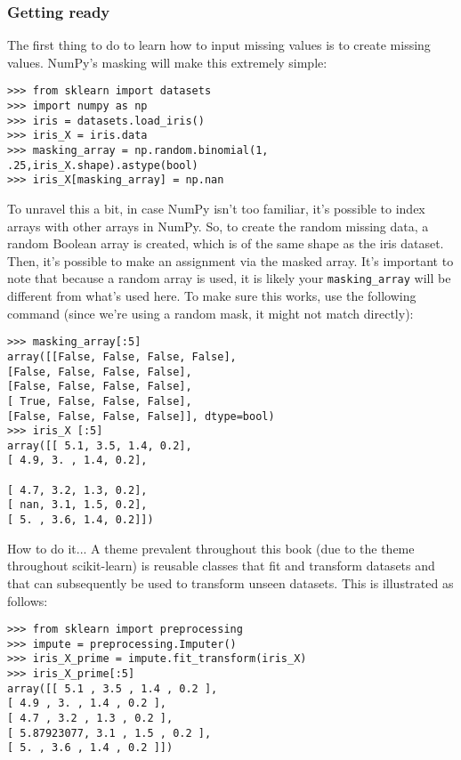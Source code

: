 \documentclass[SKL-MASTER.tex]{subfiles}
\begin{document}
\subsubsection{Getting ready}
The first thing to do to learn how to input missing values is to create missing values. NumPy's
masking will make this extremely simple:
\begin{framed}
\begin{verbatim}
>>> from sklearn import datasets
>>> import numpy as np
>>> iris = datasets.load_iris()
>>> iris_X = iris.data
>>> masking_array = np.random.binomial(1, .25,iris_X.shape).astype(bool)
>>> iris_X[masking_array] = np.nan
\end{verbatim}
\end{framed}
To unravel this a bit, in case NumPy isn't too familiar, it's possible to index arrays with other
arrays in NumPy. So, to create the random missing data, a random Boolean array is created,
which is of the same shape as the iris dataset. Then, it's possible to make an assignment
via the masked array. It's important to note that because a random array is used, it is likely
your \texttt{masking\_array} will be different from what's used here.
To make sure this works, use the following command (since we're using a random mask,
it might not match directly):
\begin{framed}
\begin{verbatim}
>>> masking_array[:5]
array([[False, False, False, False],
[False, False, False, False],
[False, False, False, False],
[ True, False, False, False],
[False, False, False, False]], dtype=bool)
>>> iris_X [:5]
array([[ 5.1, 3.5, 1.4, 0.2],
[ 4.9, 3. , 1.4, 0.2],

[ 4.7, 3.2, 1.3, 0.2],
[ nan, 3.1, 1.5, 0.2],
[ 5. , 3.6, 1.4, 0.2]])
\end{verbatim}
\end{framed}
How to do it...
A theme prevalent throughout this book (due to the theme throughout scikit-learn) is reusable
classes that fit and transform datasets and that can subsequently be used to transform unseen
datasets. This is illustrated as follows:
\begin{framed}
	\begin{verbatim}
>>> from sklearn import preprocessing
>>> impute = preprocessing.Imputer()
>>> iris_X_prime = impute.fit_transform(iris_X)
>>> iris_X_prime[:5]
array([[ 5.1 , 3.5 , 1.4 , 0.2 ],
[ 4.9 , 3. , 1.4 , 0.2 ],
[ 4.7 , 3.2 , 1.3 , 0.2 ],
[ 5.87923077, 3.1 , 1.5 , 0.2 ],
[ 5. , 3.6 , 1.4 , 0.2 ]])
\end{verbatim}
\end{framed}
\end{document}
